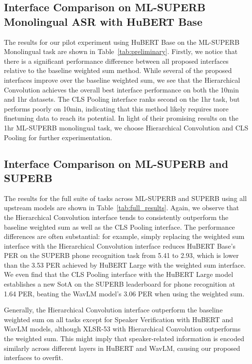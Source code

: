  
\subsection{Interface Comparison on ML-SUPERB Monolingual ASR with HuBERT Base}

The results for our pilot experiment using HuBERT Base on the ML-SUPERB Monolingual task are shown in Table~\ref{tab:preliminary}. Firstly, we notice that there is a significant performance difference between all proposed interfaces relative to the baseline weighted sum method. While several of the proposed interfaces improve over the baseline weighted sum, we see that the Hierarchical Convolution achieves the overall best interface performance on both the 10min and 1hr datasets.
The CLS Pooling interface ranks second on the 1hr task, but performs poorly on 10min, indicating that this method likely requires more finetuning data to reach its potential.
In light of their promising results on the 1hr ML-SUPERB monolingual task, we choose Hierarchical Convolution and CLS Pooling for further experimentation.

\subsection{Interface Comparison on ML-SUPERB and SUPERB}
The results for the full suite of tasks across ML-SUPERB and SUPERB using all upstream models are shown in Table~\ref{tab:full_results}. Again, we observe that the Hierarchical Convolution interface tends to consistently outperform the baseline weighted sum as well as the CLS Pooling interface.
The performance differences are often substantial: for example, simply replacing the weighted sum interface with the Hierarchical Convolution interface reduces HuBERT Base's PER on the SUPERB phone recognition task from 5.41 to 2.93, which is lower than the 3.53 PER achieved by HuBERT Large with the weighted sum interface.
We even find that the CLS Pooling interface with the HuBERT Large model establishes a new SotA on the SUPERB leaderboard for phone recognition at 1.64 PER, beating the WavLM model's 3.06 PER when using the weighted sum.

Generally, the Hierarchical Convolution interface
outperform the baseline weighted sum on all tasks except for Speaker Verification with HuBERT and WavLM models, although XLSR-53 with Hierarchical Convolution outperforms the weighted sum.
This might imply that speaker-related information is encoded similarly across different layers in HuBERT and WavLM, causing our proposed interfaces to overfit.

